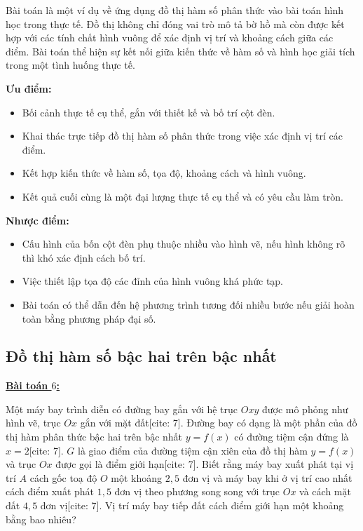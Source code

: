 \documentclass[12pt,a4paper,oneside]{book}
\theoremstyle{theorem}
\theoremstyle{definition}
\begin{document}
        Bài toán là một ví dụ về ứng dụng đồ thị hàm số phân thức vào bài toán hình học trong thực tế. Đồ thị không chỉ đóng vai trò mô tả bờ hồ mà còn được kết hợp với các tính chất hình vuông để xác định vị trí và khoảng cách giữa các điểm. Bài toán thể hiện sự kết nối giữa kiến thức về hàm số và hình học giải tích trong một tình huống thực tế.
        
        \textbf{Ưu điểm:}
        \begin{itemize}
            \item Bối cảnh thực tế cụ thể, gắn với thiết kế và bố trí cột đèn.
            \item Khai thác trực tiếp đồ thị hàm số phân thức trong việc xác định vị trí các điểm.
            \item Kết hợp kiến thức về hàm số, tọa độ, khoảng cách và hình vuông.
            \item Kết quả cuối cùng là một đại lượng thực tế cụ thể và có yêu cầu làm tròn.
        \end{itemize}
        
        \textbf{Nhược điểm:}
        \begin{itemize}
            \item Cấu hình của bốn cột đèn phụ thuộc nhiều vào hình vẽ, nếu hình không rõ thì khó xác định cách bố trí.
            \item Việc thiết lập tọa độ các đỉnh của hình vuông khá phức tạp.
            \item Bài toán có thể dẫn đến hệ phương trình tương đối nhiều bước nếu giải hoàn toàn bằng phương pháp đại số.
        \end{itemize}
    \subsection{Đồ thị hàm số bậc hai trên bậc nhất}
    \textbf{\underline{Bài toán $6$:}}

        Một máy bay trình diễn có đường bay gắn với hệ trục $Oxy$ được mô phỏng như hình vẽ, trục $Ox$ gắn với mặt đất[cite: 7]. Đường bay có dạng là một phần của đồ thị hàm phân thức bậc hai trên bậc nhất $y = f(x)$ có đường tiệm cận đứng là $x = 2$[cite: 7]. $G$ là giao điểm của đường tiệm cận xiên của đồ thị hàm $y = f(x)$ và trục $Ox$ được gọi là điểm giới hạn[cite: 7]. Biết rằng máy bay xuất phát tại vị trí $A$ cách gốc toạ độ $O$ một khoảng $2,5$ đơn vị và máy bay khi ở vị trí cao nhất cách điểm xuất phát $1,5$ đơn vị theo phương song song với trục $Ox$ và cách mặt đất $4,5$ đơn vị[cite: 7]. Vị trí máy bay tiếp đất cách điểm giới hạn một khoảng bằng bao nhiêu?
        
\end{document}

